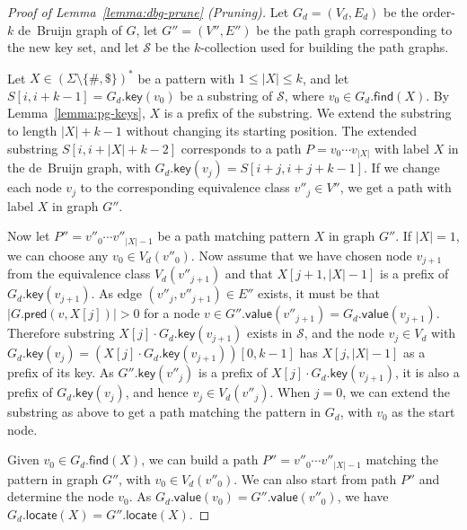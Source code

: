 \documentclass[a4paper,UKenglish]{lipics-v2016}
\newcommand{\set}[1]{\ensuremath{\{ #1 \}}}
\newcommand{\abs}[1]{\ensuremath{\lvert #1 \rvert}}
\newcommand{\find}{\ensuremath{\mathsf{find}}}
\newcommand{\locate}{\ensuremath{\mathsf{locate}}}
\newcommand{\gpred}{\ensuremath{\mathsf{pred}}}
\newcommand{\gkey}{\ensuremath{\mathsf{key}}}
\newcommand{\gvalue}{\ensuremath{\mathsf{value}}}
\newcommand{\kcollection}[1]{$#1$\nobreakdash-collection}
\newcommand{\orderk}[1]{order\nobreakdash-$#1$}
\newcommand{\patternset}{\ensuremath{(\Sigma \setminus \set{\#, \$})^{\ast}}}
\begin{document}
\begin{proof}[Proof of Lemma~\ref{lemma:dbg-prune} (Pruning)]
Let $G_{d} = (V_{d}, E_{d})$ be the \orderk{k} de~Bruijn graph of $G$, let $G'' = (V'', E'')$ be the path graph corresponding to the new key set, and let $\mathcal{S}$ be the \kcollection{k} used for building the path graphs.

Let $X \in \patternset$ be a pattern with $1 \le \abs{X} \le k$, and let $S[i, i+k-1] = G_{d}.\gkey(v_{0})$ be a substring of $\mathcal{S}$, where $v_{0} \in G_{d}.\find(X)$. By Lemma~\ref{lemma:pg-keys}, $X$ is a prefix of the substring. We extend the substring to length $\abs{X}+k-1$ without changing its starting position. The extended substring $S[i, i+\abs{X}+k-2]$ corresponds to a path $P = v_{0} \dotsm v_{\abs{X}}$ with label $X$ in the de~Bruijn graph, with $G_{d}.\gkey(v_{j}) = S[i+j, i+j+k-1]$. If we change each node $v_{j}$ to the corresponding equivalence class $v''_{j} \in V''$, we get a path with label $X$ in graph $G''$.

Now let $P'' = v''_{0} \dotsm v''_{\abs{X}-1}$ be a path matching pattern $X$ in graph $G''$. If $\abs{X} = 1$, we can choose any $v_{0} \in V_{d}(v''_{0})$. Now assume that we have chosen node $v_{j+1}$ from the equivalence class $V_{d}(v''_{j+1})$ and that $X[j+1, \abs{X}-1]$ is a prefix of $G_{d}.\gkey(v_{j+1})$. As edge $(v''_{j}, v''_{j+1}) \in E''$ exists, it must be that $\abs{G.\gpred(v, X[j])} > 0$ for a node $v \in G''.\gvalue(v''_{j+1}) = G_{d}.\gvalue(v_{j+1})$. Therefore substring $X[j] \cdot G_{d}.\gkey(v_{j+1})$ exists in $\mathcal{S}$, and the node $v_{j} \in V_{d}$ with $G_{d}.\gkey(v_{j}) = (X[j] \cdot G_{d}.\gkey(v_{j+1}))[0, k-1]$ has $X[j, \abs{X}-1]$ as a prefix of its key. As $G''.\gkey(v''_{j})$ is a prefix of $X[j] \cdot G_{d}.\gkey(v_{j+1})$, it is also a prefix of $G_{d}.\gkey(v_{j})$, and hence $v_{j} \in V_{d}(v''_{j})$. When $j = 0$, we can extend the substring as above to get a path matching the pattern in $G_{d}$, with $v_{0}$ as the start node.

Given $v_{0} \in G_{d}.\find(X)$, we can build a path $P'' = v''_{0} \dotsm v''_{\abs{X}-1}$ matching the pattern in graph $G''$, with $v_{0} \in V_{d}(v''_{0})$. We can also start from path $P''$ and determine the node $v_{0}$. As $G_{d}.\gvalue(v_{0}) = G''.\gvalue(v''_{0})$, we have $G_{d}.\locate(X) = G''.\locate(X)$.
\end{proof}
\end{document}
